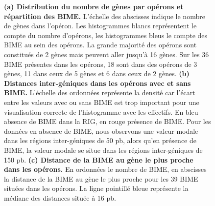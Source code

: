 \documentclass[12pt,a4paper]{report}
\begin{document}
\begin{onehalfspace}
\begin{figure}[h!]
\caption{\textbf{(a) Distribution du nombre de gènes par opérons et répartition des BIME.} L'échelle des abscisses indique le nombre de gènes dans l'opéron. Les histogrammes blancs représentent le compte du nombre d'opérons, les histogrammes bleus le compte des BIME au sein des opérons. La grande majorité des opérons sont constitués de 2 gènes mais peuvent aller jusqu'à 16 gènes. Sur les 36 BIME présentes dans les opérons, 18 sont dans des opérons de 3 gènes, 11 dans ceux de 5 gènes et 6 dans ceux de 2 gènes. \textbf{(b) Distances inter-géniques dans les opérons avec et sans BIME.} L'échelle des ordonnées représente la densité car l'écart entre les valeurs avec ou sans BIME est trop important pour une visualisation correcte de l'histogramme avec les effectifs. En bleu absence de BIME dans la RIG, en rouge présence de BIME. Pour les données en absence de BIME, nous observons une valeur modale dans les régions inter-géniques de 50 pb, alors qu'en présence de BIME, la valeur modale se situe dans les régions inter-géniques de 150 pb. \textbf{(c) Distance de la BIME au gène le plus proche dans les opérons.} En ordonnées le nombre de BIME, en abscisses la distance de la BIME au gène le plus proche pour les 39 BIME situées dans les opérons. La ligne pointillé bleue représente la médiane des distances située à 16 pb.
\label{fig:operon}}
\end{figure}


\end{onehalfspace}
\end{document}
